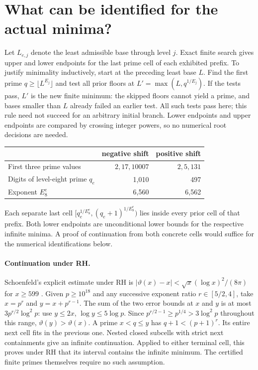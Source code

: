 \documentclass[11pt]{article}
\newcommand{\fl}[1]{\lfloor #1\rfloor}
\begin{document}
\section{What can be identified for the actual minima?}
Let $L_{e,j}$ denote the least admissible base through level $j$. Exact finite search gives upper and lower endpoints for the last prime cell of each exhibited prefix. To justify minimality inductively, start at the preceding least base $L$. Find the first prime $q\ge\fl{L^{E_j}}$ and test all prior floors at $L'=\max(L,q^{1/E_j})$. If the tests pass, $L'$ is the new finite minimum: the skipped floors cannot yield a prime, and bases smaller than $L$ already failed an earlier test. All such tests pass here; this rule need not succeed for an arbitrary initial branch. Lower endpoints and upper endpoints are compared by crossing integer powers, so no numerical root decisions are needed.
\begin{center}
\begin{tabular}{lrr}
\toprule
 & negative shift & positive shift\\
\midrule
First three prime values & $2,17,10007$ & $2,5,131$\\
Digits of level-eight prime $q_e$ & 1,010 & 497\\
Exponent $E_8^e$ & 6,560 & 6,562\\
\bottomrule
\end{tabular}
\end{center}
Each separate last cell $[q_e^{1/E_8^e},(q_e+1)^{1/E_8^e})$ lies inside every prior cell of that prefix. Both lower endpoints are unconditional lower bounds for the respective infinite minima. A proof of continuation from both concrete cells would suffice for the numerical identifications below.

\paragraph{Continuation under RH.}
Schoenfeld's explicit estimate under RH is $|\vartheta(x)-x|<\sqrt{x}(\log x)^2/(8\pi)$ for $x\ge599$ \cite{schoenfeld}. Given $p\ge10^{18}$ and any successive exponent ratio $r\in[5/2,4]$, take $x=p^r$ and $y=x+p^{r-1}$. The sum of the two error bounds at $x$ and $y$ is at most $3p^{r/2}\log^2p$: use $y\le2x$, $\log y\le 5\log p$. Since $p^{r/2-1}\ge p^{1/4}>3\log^2p$ throughout this range, $\vartheta(y)>\vartheta(x)$. A prime $x<q\le y$ has $q+1<(p+1)^r$. Its entire next cell fits in the previous one. Nested closed subcells with strict next containments give an infinite continuation. Applied to either terminal cell, this proves under RH that its interval contains the infinite minimum. The certified finite primes themselves require no such assumption.
\end{document}
